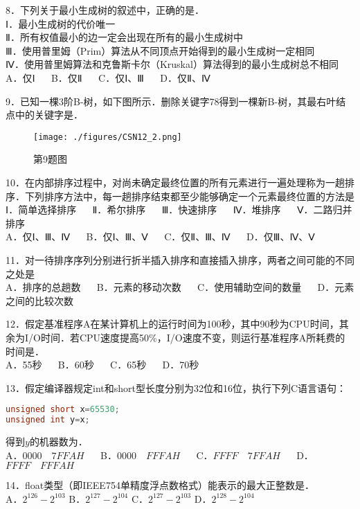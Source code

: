 8．下列关于最小生成树的叙述中，正确的是．\\
Ⅰ．最小生成树的代价唯一\\
Ⅱ．所有权值最小的边一定会出现在所有的最小生成树中\\
Ⅲ．使用普里姆（Prim）算法从不同顶点开始得到的最小生成树一定相同\\
Ⅳ．使用普里姆算法和克鲁斯卡尔（Kruskal）算法得到的最小生成树总不相同\\
A．仅Ⅰ $\quad$ B．仅Ⅱ $\quad$ C．仅Ⅰ、Ⅲ $\quad$ D．仅Ⅱ、Ⅳ

9．已知一棵3阶B-树，如下图所示．删除关键字78得到一棵新B-树，其最右叶结点中的关键字是．\\
\begin{figure}[ht]
\centering
\texttt{[image: ./figures/CSN12\_2.png]}
\caption{第9题图} \label{CSN12_fig2}
\end{figure}

10．在内部排序过程中，对尚未确定最终位置的所有元素进行一遍处理称为一趟排序．下列排序方法中，每一趟排序结束都至少能够确定一个元素最终位置的方法是\\
Ⅰ．简单选择排序 $\quad$ Ⅱ．希尔排序 $\quad$ Ⅲ．快速排序 $\quad$ Ⅳ．堆排序 $\quad$ Ⅴ．二路归并排序\\
A．仅Ⅰ、Ⅲ、Ⅳ $\quad$ B．仅Ⅰ、Ⅲ、Ⅴ $\quad$ C．仅Ⅱ、Ⅲ、Ⅳ $\quad$ D．仅Ⅲ、Ⅳ、Ⅴ

11．对一待排序序列分别进行折半插入排序和直接插入排序，两者之间可能的不同之处是\\
A．排序的总趟数 $\quad$ B．元素的移动次数 $\quad$ C．使用辅助空间的数量 $\quad$ D．元素之间的比较次数

12．假定基准程序A在某计算机上的运行时间为100秒，其中90秒为CPU时间，其余为I/O时间．若CPU速度提高50\%，I/O速度不变，则运行基准程序A所耗费的时间是．\\
A．55秒 $\quad$ B．60秒 $\quad$ C．65秒 $\quad$ D．70秒

13．假定编译器规定int和short型长度分别为32位和16位，执行下列C语言语句：\\
\begin{lstlisting}[language=cpp]
unsigned short x=65530;
unsigned int y=x;
\end{lstlisting}
得到$y$的机器数为．\\
A．$0000 \quad 7FFAH$ $\quad$ B．$0000 \quad FFFAH$ $\quad$ C．$FFFF \quad 7FFAH$ $\quad$ D．$FFFF \quad FFFAH$

14．float类型（即IEEE754单精度浮点数格式）能表示的最大正整数是．\\
A．$2^{126}-2^{103}$ B．$2^{127}-2^{104}$ C．$2^{127}-2^{103}$ D．$2^{128}-2^{104}$

